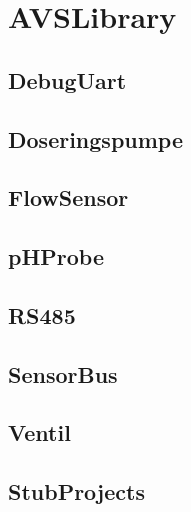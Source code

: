 \section{AVSLibrary}

\subsection{DebugUart}


\subsection{Doseringspumpe}


\subsection{FlowSensor}


\subsection{pHProbe}


\subsection{RS485}


\subsection{SensorBus}


\subsection{Ventil}


\subsection{StubProjects}
